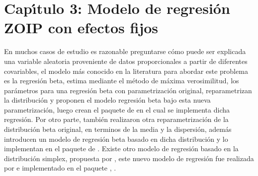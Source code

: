 \chapter{Cap\'{\i}tulo 3: Modelo de regresi\'{o}n ZOIP con efectos fijos}\label{cap3}

En muchos casos de estudio es razonable preguntarse c\'{o}mo puede ser explicada una variable aleatoria proveniente de datos proporcionales a partir de diferentes covariables, el modelo m\'{a}s conocido en la literatura para abordar este problema es la regresi\'{o}n beta, \cite{Paolino1} estima mediante el m\'{e}todo de m\'{a}xima verosimilitud, los par\'{a}metros para una regresi\'{o}n beta con parametrizaci\'{o}n original, \cite{Ferrari2} reparametrizan la distribuci\'{o}n y proponen el modelo regresi\'{o}n beta bajo esta nueva parametrizaci\'{o}n, luego \cite{Zeileis1} crean el paquete  de  en el cual se implementa dicha regresi\'{o}n. Por otro parte, \cite{Stasinopoulos2} tambi\'{e}n realizaron otra reparametrizaci\'{o}n de la distribuci\'{o}n beta original, en terminos de la media y la dispersi\'{o}n, adem\'{a}s introducen un modelo de regresi\'{o}n beta basado en dicha distribuci\'{o}n y lo implementan en el paquete  de . Existe otro modelo de regresi\'{o}n basado en  la distribuci\'{o}n simplex, propuesta por \cite{Barndorff1}, este nuevo modelo de regresi\'{o}n fue realizada por \cite{Qiu1} e implementado en el paquete , \cite{Zhang1}.\\


